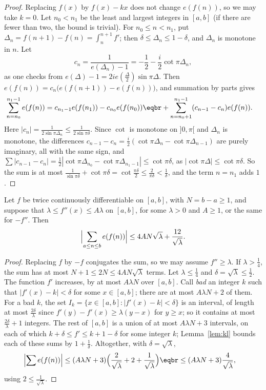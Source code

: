 \begin{proof}
Replacing $f(x)$ by $f(x)-kx$ does not change $e(f(n))$, so we may take $k=0$. Let $n_0<n_1$ be the least and largest integers in $[a,b]$ (if there are fewer than two, the bound is trivial). For
$n_0\le n<n_1$, put $\Delta_n=f(n+1)-f(n)=\int_n^{n+1}f'$; then $\delta\le\Delta_n\le1-\delta$, and $\Delta_n$ is monotone in $n$. Let
\[
c_n=\frac1{e(\Delta_n)-1}=-\frac12-\frac i2\cot\pi\Delta_n,
\]
as one checks from $e(\Delta)-1=2ie(\frac\Delta2)\sin\pi\Delta$. Then $e(f(n))=c_n\bigl(e(f(n+1))-e(f(n))\bigr)$, and summation by parts gives
\[
\begin{aligned}\sum_{n=n_0}^{n_1-1}e(f(n))&=c_{n_1-1}e(f(n_1))-c_{n_0}e(f(n_0))\eqbr+\sum_{n=n_0+1}^{n_1-1}(c_{n-1}-c_n)e(f(n)).\end{aligned}
\]
Here $|c_n|=\frac1{2\sin\pi\Delta_n}\le\frac1{2\sin\pi\delta}$. Since $\cot$ is monotone on $]0,\pi[$ and $\Delta_n$ is monotone, the differences $c_{n-1}-c_n=\frac i2(\cot\pi\Delta_n-\cot\pi\Delta_{n-1})$ are purely imaginary, all with the same sign, and
$\sum|c_{n-1}-c_n|=\frac12|\cot\pi\Delta_{n_0}-\cot\pi\Delta_{n_1-1}|\le\cot\pi\delta$, as $|\cot\pi\Delta|\le\cot\pi\delta$. So the sum is at most $\frac1{\sin\pi\delta}+\cot\pi\delta=\cot\frac{\pi\delta}2\le\frac2{\pi\delta}<\frac1\delta$,
and the term $n=n_1$ adds $1$.
\end{proof}

\begin{theorem}\label{thm:secondderiv}
Let $f$ be twice continuously differentiable on $[a,b]$, with $N=b-a\ge1$, and suppose that $\lambda\le f''(x)\le A\lambda$ on $[a,b]$, for some $\lambda>0$ and $A\ge1$, or the same for $-f''$. Then
\[
\Bigl|\sum_{a\le n\le b}e(f(n))\Bigr|\le4AN\sqrt\lambda+\frac{12}{\sqrt\lambda}.
\]
\end{theorem}

\begin{proof}
Replacing $f$ by $-f$ conjugates the sum, so we may assume $f''\ge\lambda$. If $\lambda>\frac14$, the sum has at most $N+1\le2N\le4AN\sqrt\lambda$ terms. Let $\lambda\le\frac14$ and $\delta=\sqrt\lambda\le\frac12$. The
function $f'$ increases, by at most $A\lambda N$ over $[a,b]$. Call \emph{bad} an integer $k$ such that $|f'(x)-k|<\delta$ for some $x\in[a,b]$; there are at most $A\lambda N+2$ of them. For a bad $k$, the set
$I_k=\{x\in[a,b]:|f'(x)-k|<\delta\}$ is an interval, of length at most $\frac{2\delta}\lambda$ since $f'(y)-f'(x)\ge\lambda(y-x)$ for $y\ge x$; so it contains at most $\frac{2\delta}\lambda+1$ integers. The rest of $[a,b]$ is a union of at most
$A\lambda N+3$ intervals, on each of which $k+\delta\le f'\le k+1-\delta$ for some integer $k$; Lemma~\ref{lem:kl} bounds each of these sums by $1+\frac1\delta$. Altogether, with $\delta=\sqrt\lambda$,
\[
\begin{aligned}\Bigl|\sum e(f(n))\Bigr|&\le(A\lambda N+3)\Bigl(\frac2{\sqrt\lambda}+2+\frac1{\sqrt\lambda}\Bigr)\eqbr\le(A\lambda N+3)\frac4{\sqrt\lambda},\end{aligned}
\]
using $2\le\frac1{\sqrt\lambda}$.
\end{proof}

